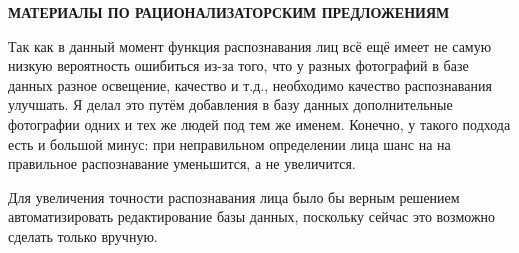 \begin{center}
\bfseries{\large МАТЕРИАЛЫ ПО РАЦИОНАЛИЗАТОРСКИМ ПРЕДЛОЖЕНИЯМ}
\end{center}

Так как в данный момент функция распознавания лиц всё ещё имеет не самую низкую вероятность ошибиться из-за того, что у разных фотографий в базе данных разное освещение, качество и т.д., необходимо качество распознавания улучшать. Я делал это путём добавления в базу данных дополнительные фотографии одних и тех же людей под тем же именем. Конечно, у такого подхода есть и большой минус: при неправильном определении лица шанс на на правильное распознавание уменьшится, а не увеличится.

Для увеличения точности распознавания лица было бы верным решением автоматизировать редактирование базы данных, поскольку сейчас это возможно сделать только вручную.

\pagebreak

